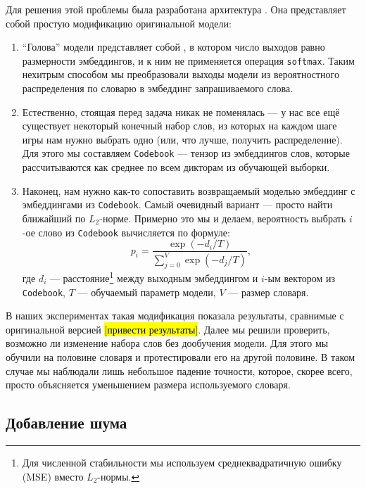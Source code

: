 Для решения этой проблемы была разработана архитектура \cbenquirer{}. Она
представляет собой простую модификацию оригинальной модели:
\begin{enumerate}
    \item ``Голова'' модели представляет собой \enquirer{}, в котором число
    выходов равно размерности эмбеддингов, и к ним не применяется операция
    \texttt{softmax}. Таким нехитрым способом мы преобразовали выходы модели из
    вероятностного распределения по словарю в эмбеддинг запрашиваемого слова.
    \item Естественно, стоящая перед \cbenquirer{} задача никак не поменялась ---
    у нас все ещё существует некоторый конечный набор слов, из которых на
    каждом шаге игры нам нужно выбрать одно (или, что лучше, получить
    распределение). Для этого мы составляем \texttt{Codebook} --- тензор из
    эмбеддингов слов, которые рассчитываются как среднее по всем дикторам из
    обучающей выборки.
    \item Наконец, нам нужно как-то сопоставить возвращаемый моделью эмбеддинг
    с эмбеддингами из \texttt{Codebook}. Самый очевидный вариант --- просто
    найти ближайший по $L_2$-норме. Примерно это мы и делаем, вероятность
    выбрать $i$-ое слово из \texttt{Codebook} вычисляется по формуле:
    \begin{equation*}
        p_i = \frac{\exp{(-d_i/T)}}{\sum_{j=0}^{V}{\exp{(-d_j/T)}}},
    \end{equation*}
    где $d_i$ --- расстояние\footnote{
        Для численной стабильности мы используем среднеквадратичную ошибку (MSE)
        вместо $L_2$-нормы.
    } между выходным эмбеддингом и $i$-ым вектором из \texttt{Codebook}, $T$ ---
    обучаемый параметр модели, $V$ --- размер словаря.
\end{enumerate}

В наших экспериментах такая модификация показала результаты, сравнимые с
оригинальной версией \enquirer{} \hl{[привести результаты]}. Далее мы решили
проверить, возможно ли изменение набора слов без дообучения модели. Для этого
мы обучили \cbenquirer{} на половине словаря и протестировали его на другой
половине. В таком случае мы наблюдали лишь небольшое падение точности, которое,
скорее всего, просто объясняется уменьшением размера используемого словаря.

\subsection{Добавление шума}

